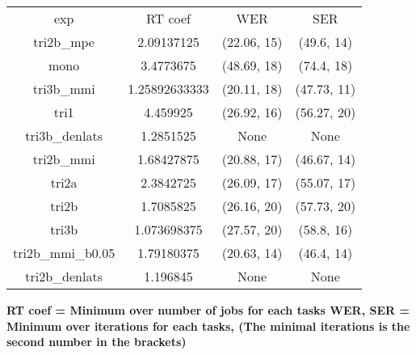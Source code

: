 \begin{tabular}{cccc}
exp             & RT coef       & WER         & SER        \\
tri2b_mpe       & 2.09137125    & (22.06, 15) & (49.6, 14) \\
mono            & 3.4773675     & (48.69, 18) & (74.4, 18) \\
tri3b_mmi       & 1.25892633333 & (20.11, 18) & (47.73, 11)\\
tri1            & 4.459925      & (26.92, 16) & (56.27, 20)\\
tri3b_denlats   & 1.2851525     & None        & None       \\
tri2b_mmi       & 1.68427875    & (20.88, 17) & (46.67, 14)\\
tri2a           & 2.3842725     & (26.09, 17) & (55.07, 17)\\
tri2b           & 1.7085825     & (26.16, 20) & (57.73, 20)\\
tri3b           & 1.073698375   & (27.57, 20) & (58.8, 16) \\
tri2b_mmi_b0.05 & 1.79180375    & (20.63, 14) & (46.4, 14) \\
tri2b_denlats   & 1.196845      & None        & None
\end{tabular}

{\bf RT coef = Minimum over number of jobs for each tasks
WER, SER = Minimum over iterations for each tasks, 
(The minimal iterations is the second number in the brackets)}
